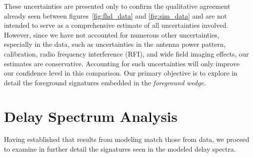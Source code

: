 \documentclass[preprint2,iop,numberedappendix]{emulateapj}
\begin{document}
\begin{figure}[htb]
\end{figure}

These uncertainties are presented only to confirm the qualitative agreement already seen between figures~\ref{fig:fhd_data} and \ref{fig:sim_data} and are not intended to serve as a comprehensive estimate of all uncertainties involved. However, since we have not accounted for numerous other uncertainties, especially in the data, such as uncertainties in the antenna power pattern, calibration, radio frequency interference (RFI), and wide field imaging effects, our estimates are conservative. Accounting for such uncertainties will only improve our confidence level in this comparison. Our primary objective is to explore in detail the foreground signatures embedded in the {\it foreground wedge}.

\section{Delay Spectrum Analysis}\label{sec:delay-spectrum-analysis}

Having established that results from modeling match those from data, we proceed to examine in further detail the signatures seen in the modeled delay spectra. 
\end{document}
